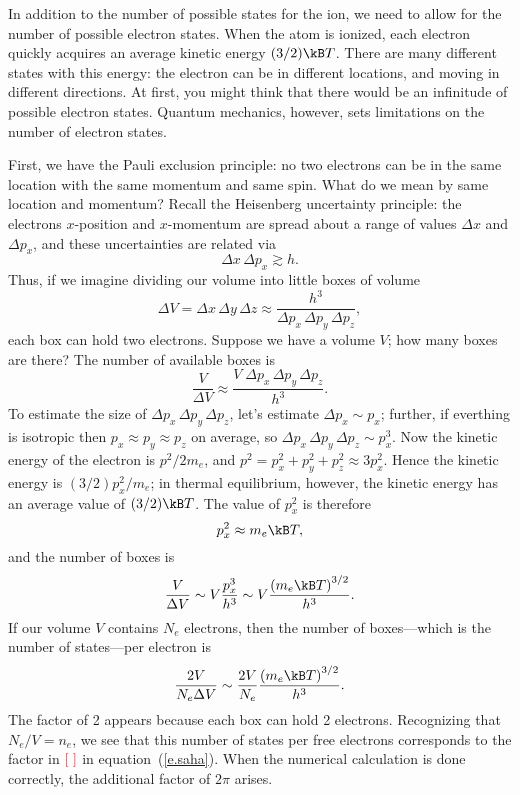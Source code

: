 In addition to the number of possible states for the ion, we need to allow for the number of possible electron states.  When the atom is ionized, each electron quickly acquires an average kinetic energy $(3/2)\kB T$. There are many different states with this energy: the electron can be in different locations, and moving in different directions.  At first, you might think that there would be an infinitude of possible electron states.  Quantum mechanics, however, sets limitations on the number of electron states.

First, we have the Pauli exclusion principle: no two electrons can be in the same location with the same momentum and same spin. What do we mean by same location and momentum?  Recall the Heisenberg uncertainty principle: the electrons $x$-position and $x$-momentum are spread about a range of values $\Delta x$ and $\Delta p_{x}$, and these uncertainties are related via
\[ \Delta x\,\Delta p_{x} \gtrsim h. \]
Thus, if we imagine dividing our volume into little boxes of volume
\[ 
 \Delta V = \Delta x\,\Delta y\,\Delta z \approx \frac{h^{3}}{\Delta p_{x}\,\Delta p_{y}\,\Delta p_{z}},
\]
each box can hold two electrons. Suppose we have a volume $V$; how many boxes are there?  The number of available boxes is
\[
	\frac{V}{\Delta V} \approx \frac{V\;\Delta p_{x}\,\Delta p_{y}\,\Delta p_{z}}{h^{3}}.
\]
To estimate the size of $\Delta p_{x}\,\Delta p_{y}\,\Delta p_{z}$, let's estimate $\Delta p_{x}\sim p_{x}$; further, if everthing is isotropic then $p_{x}\approx p_{y}\approx p_{z}$ on average, so $\Delta p_{x}\,\Delta p_{y}\,\Delta p_{z} \sim p_{x}^{3}$.  Now the kinetic energy of the electron is $p^{2}/2m_{e}$, and $p^{2} = p_{x}^{2} + p_{y}^{2} + p_{z}^{2} \approx 3 p_{x}^{2}$. Hence the kinetic energy is $(3/2)p_{x}^{2}/m_{e}$; in thermal equilibrium, however, the kinetic energy has an average value of $(3/2)\kB T$.  The value of $p_{x}^{2}$ is therefore
\[
	p_{x}^{2} \approx m_{e}\kB T,
\]
and the number of boxes is
\[
	\frac{V}{\Delta V} \sim V\frac{p_{x}^{3}}{h^{3}} \sim V\frac{\left(m_{e}\kB T\right)^{3/2}}{h^{3}}.
\]
If our volume $V$ contains $N_{e}$ electrons, then the number of boxes---which is the number of states---per electron is
\[
	\frac{2V}{N_{e}\Delta V} \sim \frac{2V}{N_{e}}\frac{\left(m_{e}\kB T\right)^{3/2}}{h^{3}}.
\]
The factor of 2 appears because each box can hold 2 electrons.  Recognizing that $N_{e}/V = n_{e}$, we see that this number of states per free electrons corresponds to the factor in $\color{red}\left[\;\right]$ in equation~(\ref{e.saha}). When the numerical calculation is done correctly, the additional factor of $2\pi$ arises.

